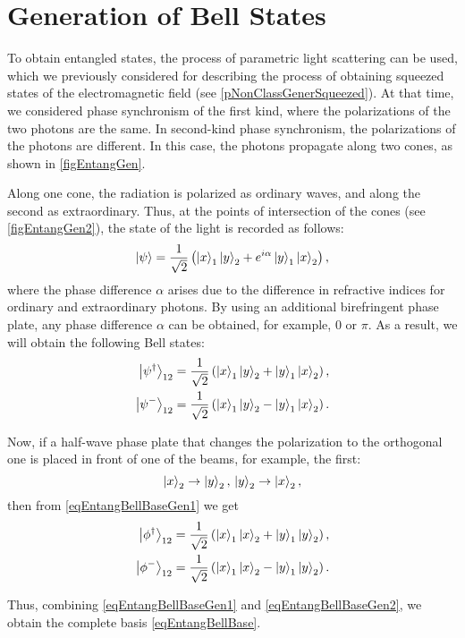 \section{Generation of Bell States}
\label{subsecPart3NonclassEntanglBelGener}

To obtain entangled states, the process of parametric light scattering can be used, which we previously considered for describing the process of obtaining squeezed states of the electromagnetic field (see \ref{pNonClassGenerSqueezed}). At that time, we considered phase synchronism of the first kind, where the polarizations of the two photons are the same. In second-kind phase synchronism, the polarizations of the photons are different. In this case, the photons propagate along two cones, as shown in \autoref{figEntangGen}.



Along one cone, the radiation is polarized as ordinary waves, and along the second as extraordinary. Thus, at the points of intersection of the cones (see \autoref{figEntangGen2}), the state of the light is recorded as follows:
\begin{equation}
\left|\psi\right> =
  \frac{1}{\sqrt{2}}\left(
  \ket{x}_1\ket{y}_2 + e^{i \alpha}
  \ket{y}_1\ket{x}_2
  \right),
\nonumber
\end{equation}
where the phase difference $\alpha$ arises due to the difference in refractive indices for ordinary and extraordinary photons. By using an additional birefringent phase plate, any phase difference $\alpha$ can be obtained, for example, $0$ or $\pi$. As a result, we will obtain the following Bell states:
\begin{eqnarray}
  \left|\psi^{\dag}\right>_{12} = 
  \frac{1}{\sqrt{2}}\left(
  \ket{x}_1\ket{y}_2 + 
  \ket{y}_1\ket{x}_2
  \right),
  \nonumber \\
  \left|\psi^{-}\right>_{12} = 
  \frac{1}{\sqrt{2}}\left(
  \ket{x}_1\ket{y}_2 - 
  \ket{y}_1\ket{x}_2
  \right).
  \label{eqEntangBellBaseGen1}
\end{eqnarray}



Now, if a half-wave phase plate that changes the polarization to the orthogonal one is placed in front of one of the beams, for example, the first:
\begin{equation}
\ket{x}_2 \rightarrow \ket{y}_2, \, \ket{y}_2 \rightarrow \ket{x}_2,
\nonumber
\end{equation}
then from \eqref{eqEntangBellBaseGen1} we get
\begin{eqnarray}
  \left|\phi^{\dag}\right>_{12} = 
  \frac{1}{\sqrt{2}}\left(
  \ket{x}_1\ket{x}_2 + 
  \ket{y}_1\ket{y}_2
  \right),
  \nonumber \\
  \left|\phi^{-}\right>_{12} = 
  \frac{1}{\sqrt{2}}\left(
  \ket{x}_1\ket{x}_2 - 
  \ket{y}_1\ket{y}_2
  \right).
  \label{eqEntangBellBaseGen2}
\end{eqnarray}

Thus, combining \eqref{eqEntangBellBaseGen1} and \eqref{eqEntangBellBaseGen2}, we obtain the complete basis \eqref{eqEntangBellBase}.